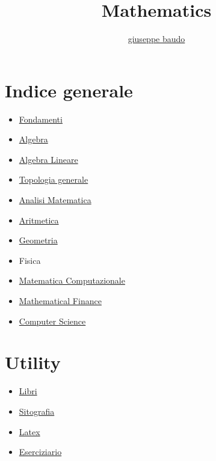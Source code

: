 \documentclass[a4paper,10pt]{article}
\title{Mathematics}
\author{\href{http://www.baudo.hol.es}{giuseppe baudo}}
\begin{document}
\maketitle

\section{Indice generale}
\begin{itemize}
  \item \href{Fondamenti.html}{Fondamenti}
  \item \href{Algebra.html}{Algebra}
  \item \href{AlgebraLineare.html}{Algebra Lineare}
  \item \href{TopologiaGenerale.html}{Topologia generale}
  \item \href{Analisi.html}{Analisi Matematica}
  \item \href{Aritmetica.html}{Aritmetica}  
  \item \href{Geometria.html}{Geometria}
  \item Fisica  
  \item \href{MatematicaComputazionale.html}{Matematica Computazionale}
  \item \href{Finance.html}{Mathematical Finance}  
  \item \href{Programming.html}{Computer Science}  
\end{itemize}

\section{Utility}
\begin{itemize}
  \item \href{Libri.html}{Libri}
  \item \href{Sitografia.html}{Sitografia}  
  \item \href{latex.html}{Latex} 
  \item \href{Eserciziario.html}{Eserciziario}  
\end{itemize}
\end{document}
